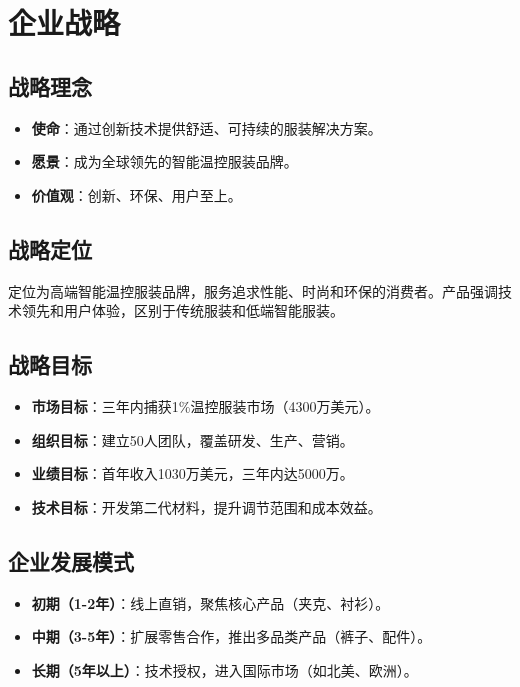 \documentclass[UTF8]{report}
\theoremstyle{MyLineTheoremStyle} %
\theoremstyle{MyBlockTheoremStyle} %
\theoremstyle{MySubsubsectionStyle} %
\begin{document}


\chapter{企业战略}
\section{战略理念}
\begin{itemize}
    \item \textbf{使命}：通过创新技术提供舒适、可持续的服装解决方案。
    \item \textbf{愿景}：成为全球领先的智能温控服装品牌。
    \item \textbf{价值观}：创新、环保、用户至上。
\end{itemize}

\section{战略定位}
定位为高端智能温控服装品牌，服务追求性能、时尚和环保的消费者。产品强调技术领先和用户体验，区别于传统服装和低端智能服装。

\section{战略目标}
\begin{itemize}
    \item \textbf{市场目标}：三年内捕获1\%温控服装市场（4300万美元）。
    \item \textbf{组织目标}：建立50人团队，覆盖研发、生产、营销。
    \item \textbf{业绩目标}：首年收入1030万美元，三年内达5000万。
    \item \textbf{技术目标}：开发第二代材料，提升调节范围和成本效益。
\end{itemize}

\section{企业发展模式}
\begin{itemize}
    \item \textbf{初期（1-2年）}：线上直销，聚焦核心产品（夹克、衬衫）。
    \item \textbf{中期（3-5年）}：扩展零售合作，推出多品类产品（裤子、配件）。
    \item \textbf{长期（5年以上）}：技术授权，进入国际市场（如北美、欧洲）。
\end{itemize}
\end{document}
